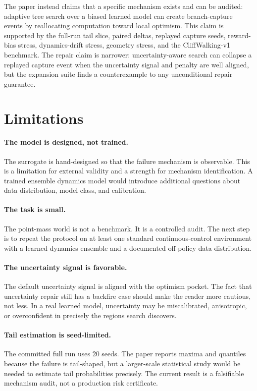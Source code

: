 \documentclass{article}
\begin{document}
The paper instead claims that a specific mechanism exists and can be audited: adaptive tree search over a biased learned model can create branch-capture events by reallocating computation toward local optimism. This claim is supported by the full-run tail slice, paired deltas, replayed capture seeds, reward-bias stress, dynamics-drift stress, geometry stress, and the CliffWalking-v1 benchmark. The repair claim is narrower: uncertainty-aware search can collapse a replayed capture event when the uncertainty signal and penalty are well aligned, but the expansion suite finds a counterexample to any unconditional repair guarantee.

\section{Limitations}

\paragraph{The model is designed, not trained.}
The surrogate is hand-designed so that the failure mechanism is observable. This is a limitation for external validity and a strength for mechanism identification. A trained ensemble dynamics model would introduce additional questions about data distribution, model class, and calibration.

\paragraph{The task is small.}
The point-mass world is not a benchmark. It is a controlled audit. The next step is to repeat the protocol on at least one standard continuous-control environment with a learned dynamics ensemble and a documented off-policy data distribution.

\paragraph{The uncertainty signal is favorable.}
The default uncertainty signal is aligned with the optimism pocket. The fact that uncertainty repair still has a backfire case should make the reader more cautious, not less. In a real learned model, uncertainty may be miscalibrated, anisotropic, or overconfident in precisely the regions search discovers.

\paragraph{Tail estimation is seed-limited.}
The committed full run uses 20 seeds. The paper reports maxima and quantiles because the failure is tail-shaped, but a larger-scale statistical study would be needed to estimate tail probabilities precisely. The current result is a falsifiable mechanism audit, not a production risk certificate.
\end{document}
